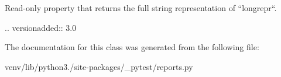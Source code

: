 \begin{DoxyVerb}Read-only property that returns the full string representation
of ``longrepr``.

.. versionadded:: 3.0
\end{DoxyVerb}
 

The documentation for this class was generated from the following file\+:\begin{DoxyCompactItemize}
\item 
venv/lib/python3./site-\/packages/\+\_\+pytest/reports.\+py\end{DoxyCompactItemize}
